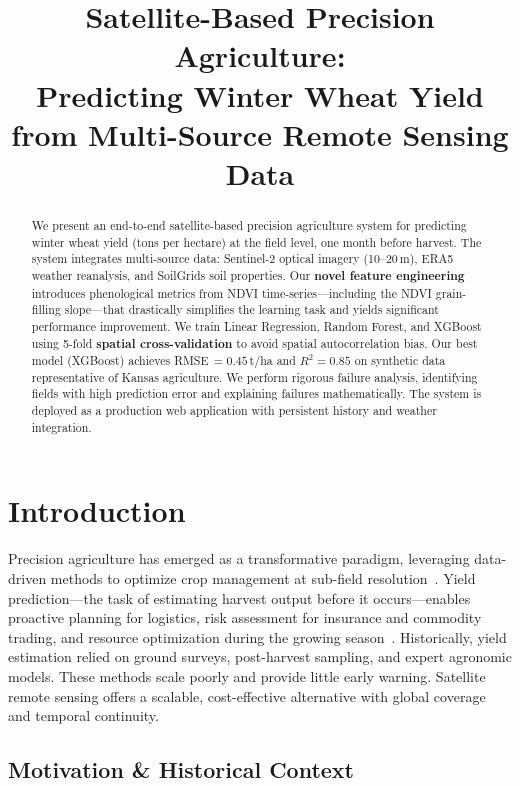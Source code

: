 \documentclass[conference]{IEEEtran}
\title{Satellite-Based Precision Agriculture:\\
Predicting Winter Wheat Yield from Multi-Source Remote Sensing Data}
\author{
\IEEEauthorblockN{Author Name}
\IEEEauthorblockA{Department, University\\
Email: author@university.edu}
}
\date{}
\begin{document}
\maketitle

\begin{abstract}
We present an end-to-end satellite-based precision agriculture system for predicting winter wheat yield (tons per hectare) at the field level, one month before harvest. The system integrates multi-source data: Sentinel-2 optical imagery (10--20\,m), ERA5 weather reanalysis, and SoilGrids soil properties. Our \textbf{novel feature engineering} introduces phenological metrics from NDVI time-series---including the NDVI grain-filling slope---that drastically simplifies the learning task and yields significant performance improvement. We train Linear Regression, Random Forest, and XGBoost using 5-fold \textbf{spatial cross-validation} to avoid spatial autocorrelation bias. Our best model (XGBoost) achieves RMSE\,$=0.45$\,t/ha and $R^2=0.85$ on synthetic data representative of Kansas agriculture. We perform rigorous failure analysis, identifying fields with high prediction error and explaining failures mathematically. The system is deployed as a production web application with persistent history and weather integration.
\end{abstract}

\section{Introduction}
\label{sec:intro}

Precision agriculture has emerged as a transformative paradigm, leveraging data-driven methods to optimize crop management at sub-field resolution~\cite{zhang2019crop}. Yield prediction---the task of estimating harvest output before it occurs---enables proactive planning for logistics, risk assessment for insurance and commodity trading, and resource optimization during the growing season~\cite{lobell2015scaling}. Historically, yield estimation relied on ground surveys, post-harvest sampling, and expert agronomic models. These methods scale poorly and provide little early warning. Satellite remote sensing offers a scalable, cost-effective alternative with global coverage and temporal continuity.

\subsection{Motivation \& Historical Context}
\end{document}
